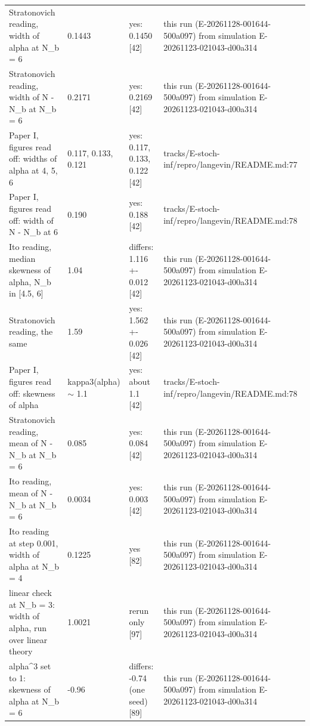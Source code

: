 \begin{table}
\begin{tabular}{p{}p{}p{}p{}}
Stratonovich reading, width of alpha at N\_b = 6 & 0.1443 & yes: 0.1450 [42] & this run (E-20261128-001644-500a097) from simulation E-20261123-021043-d00a314 \\
Stratonovich reading, width of N - N\_b at N\_b = 6 & 0.2171 & yes: 0.2169 [42] & this run (E-20261128-001644-500a097) from simulation E-20261123-021043-d00a314 \\
Paper I, figures read off: widths of alpha at 4, 5, 6 & 0.117, 0.133, 0.121 & yes: 0.117, 0.133, 0.122 [42] & tracks/\allowbreak{}E-stoch-inf/\allowbreak{}repro/\allowbreak{}langevin/\allowbreak{}README.md:77 \\
Paper I, figures read off: width of N - N\_b at 6 & 0.190 & yes: 0.188 [42] & tracks/\allowbreak{}E-stoch-inf/\allowbreak{}repro/\allowbreak{}langevin/\allowbreak{}README.md:78 \\
Ito reading, median skewness of alpha, N\_b in [4.5, 6] & 1.04 & differs: 1.116 +- 0.012 [42] & this run (E-20261128-001644-500a097) from simulation E-20261123-021043-d00a314 \\
Stratonovich reading, the same & 1.59 & yes: 1.562 +- 0.026 [42] & this run (E-20261128-001644-500a097) from simulation E-20261123-021043-d00a314 \\
Paper I, figures read off: skewness of alpha & kappa3(alpha) $\sim$ 1.1 & yes: about 1.1 [42] & tracks/\allowbreak{}E-stoch-inf/\allowbreak{}repro/\allowbreak{}langevin/\allowbreak{}README.md:78 \\
Stratonovich reading, mean of N - N\_b at N\_b = 6 & 0.085 & yes: 0.084 [42] & this run (E-20261128-001644-500a097) from simulation E-20261123-021043-d00a314 \\
Ito reading, mean of N - N\_b at N\_b = 6 & 0.0034 & yes: 0.003 [42] & this run (E-20261128-001644-500a097) from simulation E-20261123-021043-d00a314 \\
Ito reading at step 0.001, width of alpha at N\_b = 4 & 0.1225 & yes [82] & this run (E-20261128-001644-500a097) from simulation E-20261123-021043-d00a314 \\
linear check at N\_b = 3: width of alpha, run over linear theory & 1.0021 & rerun only [97] & this run (E-20261128-001644-500a097) from simulation E-20261123-021043-d00a314 \\
alpha\^{}3 set to 1: skewness of alpha at N\_b = 6 & -0.96 & differs: -0.74 (one seed) [89] & this run (E-20261128-001644-500a097) from simulation E-20261123-021043-d00a314 \\
\bottomrule
\end{tabular}
\end{table}

